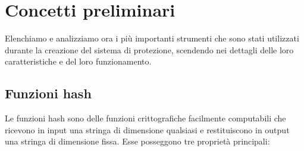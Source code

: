 \documentclass[12pt]{report}
\begin{document}
\chapter{Concetti preliminari}
\noindent
Elenchiamo e analizziamo ora i più importanti strumenti che sono stati utilizzati durante la creazione del sistema di protezione, scendendo nei dettagli delle loro caratteristiche e del loro funzionamento.

\section{Funzioni hash}
Le funzioni hash sono delle funzioni crittografiche facilmente computabili che ricevono in input una stringa di dimensione qualsiasi e restituiscono in output una stringa di dimensione fissa.
Esse posseggono tre proprietà principali:
\end{document}
